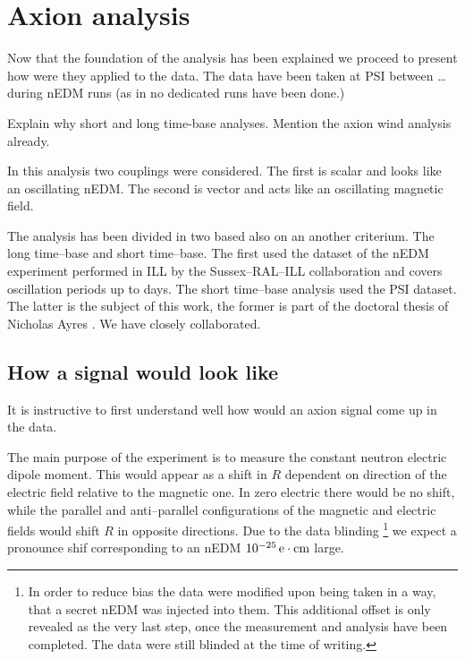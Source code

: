 \chapter{Axion analysis}
\label{ch:nedm-at-psi-apparatus}

Now that the foundation of the analysis has been explained we proceed to present how were they applied to the data. The data have been taken at PSI between \ldots during nEDM runs (as in no dedicated runs have been done.)


Explain why short and long time-base analyses. Mention the axion wind analysis already.

In this analysis two couplings were considered. The first  is scalar and looks like an oscillating nEDM. The second is vector and acts like an oscillating magnetic field.

The analysis has been divided in two based also on an another criterium. The long time--base and short time--base. The first used the dataset of the nEDM experiment performed in ILL by the Sussex--RAL--ILL collaboration and covers oscillation periods up to days. The short time--base analysis used the PSI dataset. The latter is the subject of this work, the former is part of the doctoral thesis of Nicholas Ayres . We have closely collaborated.



\section{How a signal would look like}
It is instructive to first understand well how would an axion signal come up in the data.

The main purpose of the experiment is to measure the constant neutron electric dipole moment. This would appear as a shift in $R$ dependent on direction of the electric field relative to the magnetic one. In zero electric there would be no shift, while the parallel and anti--parallel configurations of the magnetic and electric fields would shift $R$ in opposite directions. Due to the data blinding
\footnote{In order to reduce bias the data were modified upon being taken in a way, that a secret nEDM was injected into them. This additional offset is only revealed as the very last step, once the measurement and analysis have been completed. The data were still blinded at the time of writing.}
we expect a pronounce shif corresponding to an nEDM $\unit[10^{-25}]{e \cdot cm}$ large.

